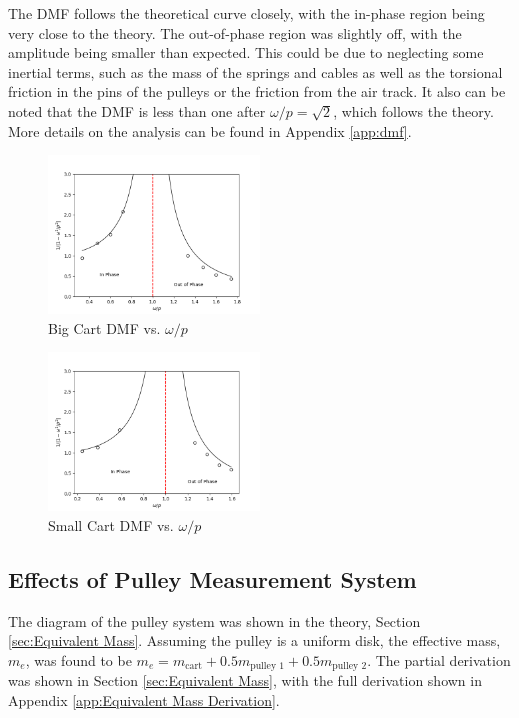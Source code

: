 The DMF follows the theoretical curve closely, with the in-phase region being very close to the theory. The out-of-phase region was slightly off, with the amplitude being smaller than expected. This could be due to neglecting some inertial terms, such as the mass of the springs and cables as well as the torsional friction in the pins of the pulleys or the friction from the air track. It also can be noted that the DMF is less than one after $\omega / p = \sqrt{2}$, which follows the theory. More details on the analysis can be found in Appendix \ref{app:dmf}.

\begin{figure}[H]
    \centering
    \includegraphics[width=0.5\textwidth]{matplotlib/big dmf vs omega over p.png}
    \caption{Big Cart DMF vs. $\omega/p$}
    \label{fig:Big DMF vs. Omega over P}
\end{figure}
\begin{figure}[H]
    \centering
    \includegraphics[width=0.5\textwidth]{matplotlib/small dmf vs omega over p.png}
    \caption{Small Cart DMF vs. $\omega/p$}
    \label{fig:Small DMF vs. Omega over P}
\end{figure}

\subsection{Effects of Pulley Measurement System}
The diagram of the pulley system was shown in the theory, Section \ref{sec:Equivalent Mass}. Assuming the pulley is a uniform disk, the effective mass, $m_e$, was found to be $m_e = m_\text{cart} + 0.5 m_\text{pulley 1} + 0.5 m_\text{pulley 2}$. The partial derivation was shown in Section \ref{sec:Equivalent Mass}, with the full derivation shown in Appendix \ref{app:Equivalent Mass Derivation}.

